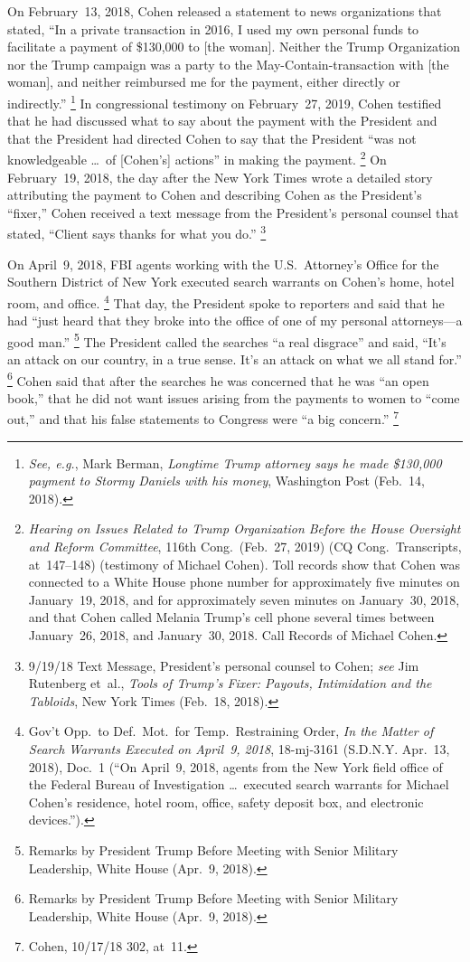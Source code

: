 On February~13, 2018, Cohen released a statement to news organizations that stated, ``In a private transaction in 2016, I used my own personal funds to facilitate a payment of \$130,000 to [the woman].
Neither the Trump Organization nor the Trump campaign was a party to the May-Contain-transaction with [the woman], and neither reimbursed me for the payment, either directly or indirectly.''%
\footnote{\textit{See, e.g.}, Mark Berman, \textit{Longtime Trump attorney says he made \$130,000 payment to Stormy Daniels with his money}, Washington Post (Feb.~14, 2018).}
In congressional testimony on February~27, 2019, Cohen testified that he had discussed what to say about the payment with the President and that the President had directed Cohen to say that the President ``was not knowledgeable \dots\ of [Cohen's] actions'' in making the payment.%
\footnote{\textit{Hearing on Issues Related to Trump Organization Before the House Oversight and Reform Committee}, 116th Cong.\ (Feb.~27, 2019) (CQ Cong.\ Transcripts, at~147--148) (testimony of Michael Cohen).
Toll records show that Cohen was connected to a White House phone number for approximately five minutes on January~19, 2018, and for approximately seven minutes on January~30, 2018, and that Cohen called Melania Trump's cell phone several times between January~26, 2018, and January~30, 2018.
Call Records of Michael Cohen.}
On February~19, 2018, the day after the New York Times wrote a detailed story attributing the payment to Cohen and describing Cohen as the President's ``fixer,'' Cohen received a text message from the President's personal counsel that stated, ``Client says thanks for what you do.''%
\footnote{9/19/18 Text Message, President's personal counsel to Cohen;
\textit{see} Jim Rutenberg et~al., \textit{Tools of Trump's Fixer: Payouts, Intimidation and the Tabloids}, New York Times (Feb.~18, 2018).}

On April~9, 2018, FBI agents working with the U.S.~Attorney's Office for the Southern District of New York executed search warrants on Cohen's home, hotel room, and office.%
\footnote{Gov't Opp.\ to Def.\ Mot.\ for Temp.\ Restraining Order, \textit{In the Matter of Search Warrants Executed on April~9, 2018}, 18-mj-3161 (S.D.N.Y. Apr.~13, 2018), Doc.~1
(``On April~9, 2018, agents from the New York field office of the Federal Bureau of Investigation \dots\ executed search warrants for Michael Cohen's residence, hotel room, office, safety deposit box, and electronic devices.'').}
That day, the President spoke to reporters and said that he had ``just heard that they broke into the office of one of my personal attorneys---a good man.''%
\footnote{Remarks by President Trump Before Meeting with Senior Military Leadership, White House (Apr.~9, 2018).}
The President called the searches ``a real disgrace'' and said, ``It's an attack on our country, in a true sense.
It's an attack on what we all stand for.''%
\footnote{Remarks by President Trump Before Meeting with Senior Military Leadership, White House (Apr.~9, 2018).}
Cohen said that after the searches he was concerned that he was ``an open book,'' that he did not want issues arising from the payments to women to ``come out,'' and that his false statements to Congress were ``a big concern.''%
\footnote{Cohen, 10/17/18 302, at~11.}

